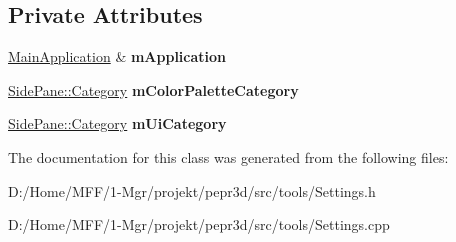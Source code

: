 \subsection*{Private Attributes}
\begin{DoxyCompactItemize}
\item 
\mbox{\label{classpepr3d_1_1_settings_a0148b73a88a1d78cd0f3d2cf6e029954}} 
\mbox{\hyperlink{classpepr3d_1_1_main_application}{Main\+Application}} \& {\bfseries m\+Application}
\item 
\mbox{\label{classpepr3d_1_1_settings_ab37151c9365505c083401b05171623e2}} 
\mbox{\hyperlink{classpepr3d_1_1_side_pane_1_1_category}{Side\+Pane\+::\+Category}} {\bfseries m\+Color\+Palette\+Category}
\item 
\mbox{\label{classpepr3d_1_1_settings_a05198990c87d8cfa45a4d26c68aafd0b}} 
\mbox{\hyperlink{classpepr3d_1_1_side_pane_1_1_category}{Side\+Pane\+::\+Category}} {\bfseries m\+Ui\+Category}
\end{DoxyCompactItemize}


The documentation for this class was generated from the following files\+:\begin{DoxyCompactItemize}
\item 
D\+:/\+Home/\+M\+F\+F/1-\/\+Mgr/projekt/pepr3d/src/tools/Settings.\+h\item 
D\+:/\+Home/\+M\+F\+F/1-\/\+Mgr/projekt/pepr3d/src/tools/Settings.\+cpp\end{DoxyCompactItemize}
